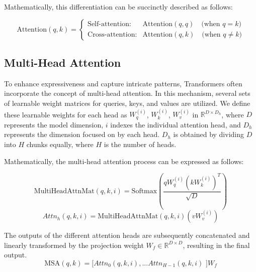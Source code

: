 Mathematically, this differentiation can be succinctly described as follows:

\begin{equation}
    \text{Attention}(q, k) = 
    \begin{cases}
        \text{Self-attention}: & \text{Attention}(q, q) \quad \text{(when \(q = k\))} \\
        \text{Cross-attention}: & \text{Attention}(q, k) \quad \text{(when \(q \neq k\))}
    \end{cases}
\end{equation}

\subsection{Multi-Head Attention}
To enhance expressiveness and capture intricate patterns, Transformers often incorporate the concept of multi-head attention. In this mechanism, several sets of learnable weight matrices for queries, keys, and values are utilized. We define these learnable weights for each head as \(W^{(i)}_q\), \(W^{(i)}_k\), \(W^{(i)}_v\) in \(\mathbb{R}^{D \times D_h}\), where \(D\) represents the model dimension, \(i\) indexes the individual attention head, and \(D_h\) represents the dimension focused on by each head. \(D_h\) is obtained by dividing \(D\) into \(H\) chunks equally, where \(H\) is the number of heads.

Mathematically, the multi-head attention process can be expressed as follows:

\begin{equation}
\text{MultiHeadAttnMat}(q, k, i) = \text{Softmax}\left(\frac{qW_{q}^{(i)}(kW_{k}^{(i)})^{T}}{\sqrt{D}}\right)
\end{equation}
\begin{equation}
\text{$Attn_{h}$}(q, k, i) = \text{MultiHeadAttnMat}(q, k, i)(vW_{v}^{(i)})
\end{equation}

The outputs of the different attention heads are subsequently concatenated and linearly transformed by the projection weight \(W_f \in \mathbb{R}^{D \times D}\), resulting in the final output. 
\begin{equation}
\label{eq:multiheadattn}
\text{MSA}(q, k) =  \text{[$Attn_{0}(q, k, i), ... Attn_{H-1}(q, k, i)$ ]}W_{f}
\end{equation}

